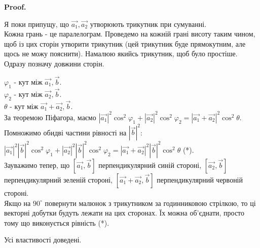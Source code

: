 \documentclass[a4paper, 10pt]{extarticle}
\makeatletter
\def\qed{$\blacksquare$}
\def\qed{$\blacksquare$}
\theoremstyle{theoremdd}
\theoremstyle{theoremdd}
\theoremstyle{theoremdd}
\theoremstyle{theoremdd}
\theoremstyle{theoremdd}
\theoremstyle{theoremdd}
\theoremstyle{theoremdd}
\theoremstyle{theoremdd}
\renewenvironment{proof}[1][Proof.\\]{\par
\pushQED{\hfill \qed}%
\normalfont \topsep6\p@\@plus6\p@\relax
\trivlist
\item\relax
{\bfseries
#1\@addpunct{.}}\hspace\labelsep\ignorespaces
}{%
\popQED\endtrivlist\@endpefalse
}
\makeatother
\begin{document}
\begin{proof}
\begin{enumerate}[wide=0pt,label={\arabic*)}]
\begin{figure}[H]
\end{figure}
Я поки припущу, що $\vec{a_1},\vec{a_2}$ утворюють трикутник при сумуванні.\\
Кожна грань - це паралелограм. Проведемо на кожній грані висоту таким чином, щоб із цих сторін утворити трикутник (цей трикутник буде прямокутним, але щось не можу пояснити). Намалюю якийсь трикутник, щоб було простіше. Одразу позначу довжини сторін.
\begin{figure}[H]
\centering
{}
\end{figure}
$\varphi_1$ - кут між $\vec{a_1}, \vec{b}$.\\
$\varphi_2$ - кут між $\vec{a_2}, \vec{b}$.\\
$\theta$ - кут між $\vec{a_1}+\vec{a_2}, \vec{b}$.\\
За теоремою Піфагора, маємо $|\vec{a_1}|^2 \cos^2 \varphi_1 + |\vec{a_2}|^2 \cos^2 \varphi_2 = |\vec{a_1}+\vec{a_2}|^2 \cos^2 \theta$.\\
Помножимо обидві частини рівності на $|\vec{b}|^2$:\\
$|\vec{a_1}|^2 |\vec{b}|^2 \cos^2 \varphi_1 + |\vec{a_2}|^2 |\vec{b}|^2 \cos^2 \varphi_2 = |\vec{a_1}+\vec{a_2}|^2 |\vec{b}|^2 \cos^2 \theta$ (*).\\
Зауважимо тепер, що $[\vec{a_1},\vec{b}]$ перпендикулярний синій стороні, $[\vec{a_2},\vec{b}]$ перпендикулярний зеленій стороні, $[\vec{a_1}+\vec{a_2},\vec{b}]$ перпендикулярний червоній стороні.\\
Якщо на $90^\circ$ повернути малюнок з трикутником за годинниковою стрілкою, то ці векторні добутки будуть лежати на цих сторонах. Їх можна об'єднати, просто тому що виконується рівність (*).
\end{enumerate}
Усі властивості доведені.
\end{proof}
\end{document}
